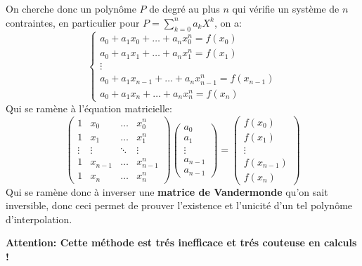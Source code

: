 \subsection*{}
On cherche donc un polynôme \(P\) de degré au plus \(n\) qui vérifie un système de \(n\) contraintes, en particulier pour \(P = \sum_{k=0}^{n} a_kX^k\), on a:
\[
   \begin{cases}
      a_0 + a_1x_0 + \ldots + a_nx_0^n = f(x_0)\\
      a_0 + a_1x_1 + \ldots + a_nx_1^n = f(x_1)\\
      \vdots\\
      a_0 + a_1x_{n-1} + \ldots + a_nx_{n-1}^n = f(x_{n-1})\\
      a_0 + a_1x_{n} + \ldots + a_nx_{n}^n = f(x_{n})
   \end{cases}
\]
Qui se ramène à l'équation matricielle:
\[
   \left(\begin{array}{cccc}
      1 & x_0 & \ldots & x_0^n\\ 
      1 & x_1 & \ldots & x_1^n\\
      \vdots & \vdots & \ddots & \vdots\\
      1 & x_{n-1} & \ldots & x_{n-1}^{n}\\ 
      1 & x_{n} & \ldots & x_{n}^n
   \end{array}\right) 
   \left(\begin{array}{c}
      a_0\\ 
      a_1\\
      \vdots\\
      a_{n-1}\\ 
      a_{n-1}
   \end{array}\right) =
   \left(\begin{array}{c}
      f(x_0)\\ 
      f(x_1)\\
      \vdots\\
      f(x_{n-1})\\ 
      f(x_{n})
   \end{array}\right)
\]
Qui se ramène donc à inverser une \textbf{matrice de Vandermonde} qu'on sait inversible, donc ceci permet de prouver l'existence et l'unicité d'un tel polynôme d'interpolation.

\begin{center}
   \textbf{Attention: Cette méthode est trés inefficace et trés couteuse en calculs !}
\end{center}
